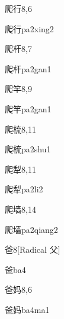 \begin{entry}{爬行}{8,6}
  \begin{phonetics}{爬行}{pa2xing2}
  \end{phonetics}
\end{entry}

\begin{entry}{爬杆}{8,7}
  \begin{phonetics}{爬杆}{pa2gan1}
  \end{phonetics}
\end{entry}

\begin{entry}{爬竿}{8,9}
  \begin{phonetics}{爬竿}{pa2gan1}
  \end{phonetics}
\end{entry}

\begin{entry}{爬梳}{8,11}
  \begin{phonetics}{爬梳}{pa2shu1}
  \end{phonetics}
\end{entry}

\begin{entry}{爬犁}{8,11}
  \begin{phonetics}{爬犁}{pa2li2}
  \end{phonetics}
\end{entry}

\begin{entry}{爬墙}{8,14}
  \begin{phonetics}{爬墙}{pa2qiang2}
  \end{phonetics}
\end{entry}

\begin{entry}{爸}{8}[Radical 父]
  \begin{phonetics}{爸}{ba4}
  \end{phonetics}
\end{entry}

\begin{entry}{爸妈}{8,6}
  \begin{phonetics}{爸妈}{ba4ma1}
  \end{phonetics}
\end{entry}

